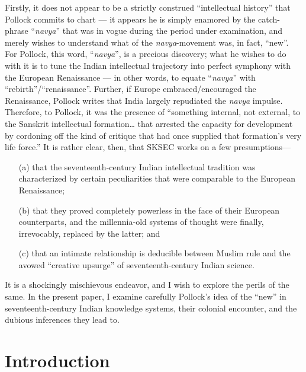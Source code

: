Firstly, it does not appear to be a strictly construed “intellectual history” that Pollock commits to chart — it appears he is simply enamored by the catch-phrase “{\sl navya}” that was in vogue during the period under examination, and merely wishes to understand what of the {\sl navya}-movement was, in fact, “new”. For Pollock, this word, “{\sl navya}”, is a precious discovery; what he wishes to do with it is to tune the Indian intellectual trajectory into perfect symphony with the European Renaissance — in other words, to equate “{\sl navya}” with “rebirth”/“renaissance”. Further, if Europe embraced/encouraged the Renaissance, Pollock writes that India largely repudiated the {\sl navya} impulse. Therefore, to Pollock, it was the presence of “something internal, not external, to the Sanskrit intellectual formation… that arrested the capacity for development by cordoning off the kind of critique that had once supplied that formation’s very life force.”
It is rather clear, then, that SKSEC works on a few presumptions—   
\begin{itemize}
\itemsep=1pt
\item[(a)] that the seventeenth-century Indian intellectual tradition was characterized by certain peculiarities that were comparable to the European Renaissance;

\item[(b)] that they proved completely powerless in the face of their European counterparts, and the millennia-old systems of thought were finally, irrevocably, replaced by the latter; and 

\item[(c)] that an intimate relationship is deducible between Muslim rule and the avowed “creative upsurge” of seventeenth-century Indian science.
\end{itemize}

It is a shockingly mischievous endeavor, and I wish to explore the perils of the same.  In the present paper, I examine carefully Pollock’s idea of the “new” in seventeenth-century Indian knowledge systems, their colonial encounter, and the dubious inferences they lead to.\\[-20pt]

\section*{Introduction}

